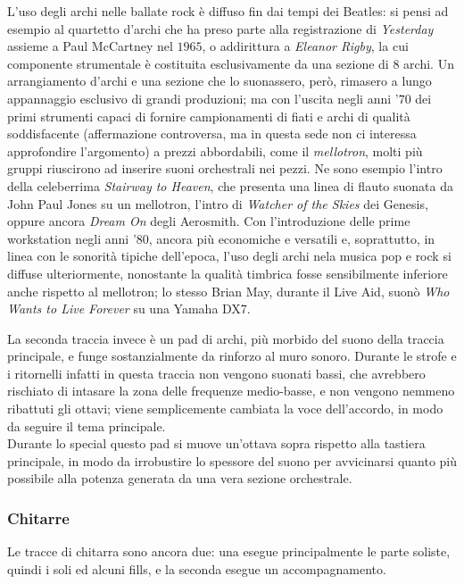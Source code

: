 \documentclass[12pt]{article}
\begin{document}
L'uso degli archi nelle ballate rock è diffuso fin dai tempi dei Beatles: si pensi ad esempio al quartetto d'archi che ha preso parte alla registrazione di \emph{Yesterday} assieme a Paul McCartney nel \(1965\), o addirittura a \emph{Eleanor Rigby}, la cui componente strumentale è costituita esclusivamente da una sezione di \(8\) archi. Un arrangiamento d'archi e una sezione che lo suonassero, però, rimasero a lungo appannaggio esclusivo di grandi produzioni; ma con l'uscita negli anni '\(70\) dei primi strumenti capaci di fornire campionamenti di fiati e archi di qualità soddisfacente (affermazione controversa, ma in questa sede non ci interessa approfondire l'argomento) a prezzi abbordabili, come il \emph{mellotron}, molti più gruppi riuscirono ad inserire suoni orchestrali nei pezzi. Ne sono esempio l'intro della celeberrima \emph{Stairway to Heaven}, che presenta una linea di flauto suonata da John Paul Jones su un mellotron, l'intro di \emph{Watcher of the Skies} dei Genesis, oppure ancora \emph{Dream On} degli Aerosmith. Con l'introduzione delle prime workstation negli anni '\(80\), ancora più economiche e versatili e, soprattutto, in linea con le sonorità tipiche dell'epoca, l'uso degli archi nela musica pop e rock si diffuse ulteriormente, nonostante la qualità timbrica fosse sensibilmente inferiore anche rispetto al mellotron; lo stesso Brian May, durante il Live Aid, suonò \emph{Who Wants to Live Forever} su una Yamaha DX7.

La seconda traccia invece è un pad di archi, più morbido del suono della traccia principale, e funge sostanzialmente da rinforzo al muro sonoro. Durante le strofe e i ritornelli infatti in questa traccia non vengono suonati bassi, che avrebbero rischiato di intasare la zona delle frequenze medio-basse, e non vengono nemmeno ribattuti gli ottavi; viene semplicemente cambiata la voce dell'accordo, in modo da seguire il tema principale.\\
Durante lo special questo pad si muove un'ottava sopra rispetto alla tastiera principale, in modo da irrobustire lo spessore del suono per avvicinarsi quanto più possibile alla potenza generata da una vera sezione orchestrale.

\subsubsection{Chitarre}
Le tracce di chitarra sono ancora due: una esegue principalmente le parte soliste, quindi i soli ed alcuni fills, e la seconda esegue un accompagnamento.
\end{document}
